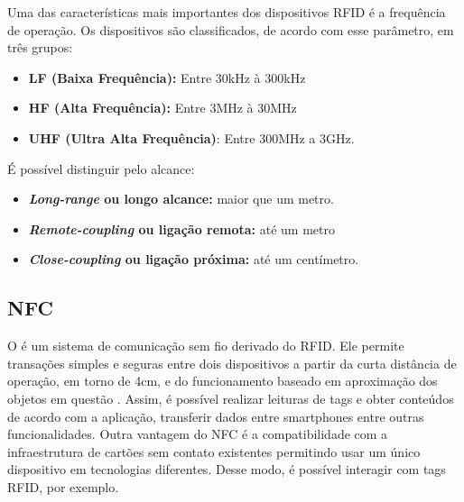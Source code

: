 

Uma das características mais importantes dos dispositivos RFID é a frequência de operação.
Os dispositivos são classificados, de acordo com esse parâmetro, em três grupos:

\begin{itemize} \parskip -4pt
	\item \textbf{LF (Baixa Frequência):} Entre 30kHz à 300kHz
	\item \textbf{HF (Alta Frequência):} Entre 3MHz à 30MHz
	\item \textbf{UHF (Ultra Alta Frequência)}: Entre 300MHz a 3GHz.
\end{itemize}

É possível distinguir pelo alcance:

\begin{itemize} \parskip -4pt
	\item \textbf{\textit{Long-range} ou longo alcance:} maior que um metro.
	\item \textbf{\textit{Remote-coupling} ou ligação remota:} até um metro
	\item \textbf{\textit{Close-coupling} ou ligação próxima:} até um centímetro.
\end{itemize}


\subsection{NFC}
O  é um sistema de comunicação sem fio derivado do RFID. Ele permite transações simples e seguras entre dois dispositivos a partir da curta distância de operação, em torno de 4cm, e do funcionamento baseado em aproximação dos objetos em questão \cite{NFCForum2016}. 
Assim, é possível realizar leituras de tags e obter conteúdos de acordo com a aplicação, transferir dados entre smartphones entre outras funcionalidades.
Outra vantagem do NFC é a compatibilidade com a infraestrutura de cartões sem contato existentes permitindo usar um único dispositivo em tecnologias diferentes. Desse modo, é possível interagir com tags RFID, por exemplo.


